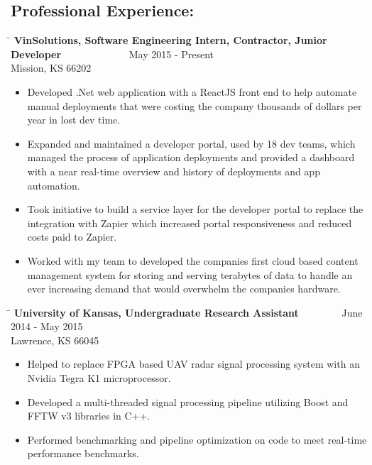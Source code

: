 \documentclass{res}
\begin{document}
\begin{resume}
\section{Professional Experience:}
   \vspace{-0.1in}	
   \begin{tabbing}
   \hspace{5.5in}\= \kill 
    {\bf VinSolutions, Software Engineering Intern, Contractor, Junior Developer} \>~~~~~~~~~~~~~May 2015 - Present\\
    Mission, KS 66202
   \end{tabbing}\vspace{-10pt}
	\begin{itemize}
		\item Developed .Net web application with a ReactJS front end to help automate manual deployments that were costing the company thousands of dollars per year in lost dev time.
		\item Expanded and maintained a developer portal, used by 18 dev teams, which managed the process of application deployments and provided a dashboard with a near real-time overview and history of deployments and app automation.
		\item Took initiative to build a service layer for the developer portal to replace the integration with Zapier which increased portal responsiveness and reduced costs paid to Zapier.
		\item Worked with my team to developed the companies first cloud based content management system for storing and serving terabytes of data to handle an ever increasing demand that would overwhelm the companies hardware. \vspace{-15pt}
	\end{itemize}
   \begin{tabbing}
   \hspace{5.5in}\= \kill
    {\bf University of Kansas, Undergraduate Research Assistant} \>~~~~~~~~June 2014 - May 2015\\
    Lawrence, KS 66045
   \end{tabbing}\vspace{-10pt}
	\begin{itemize}
		\item Helped to replace FPGA based UAV radar signal processing system with an Nvidia Tegra K1 microprocessor.
		\item Developed a multi-threaded signal processing pipeline utilizing Boost and FFTW v3 libraries in C++.
		\item Performed benchmarking and pipeline optimization on code to meet real-time performance benchmarks.\vspace{-15pt}

\end{itemize}
\end{resume}
\end{document}
